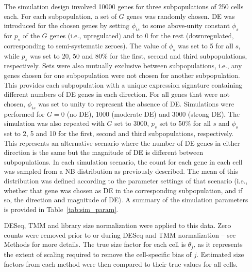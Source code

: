 \documentclass{bmcart}
\begin{document}
The simulation design involved 10000 genes for three subpopulations of 250 cells each.
For each subpopulation, a set of $G$ genes was randomly chosen.
DE was introduced for the chosen genes by setting $\phi_{is}$ to some above-unity constant $\phi_s$ for $p_s$ of the $G$ genes (i.e., upregulated) and to $0$ for the rest (downregulated, corresponding to semi-systematic zeroes).
The value of $\phi_s$ was set to 5 for all $s$, while $p_s$ was set to 20, 50 and 80\% for the first, second and third subpopulations, respectively.
Sets were also mutually exclusive between subpopulations, i.e., any genes chosen for one subpopulation were not chosen for another subpopulation.
This provides each subpopulation with a unique expression signature containing different numbers of DE genes in each direction.
For all genes that were not chosen, $\phi_{is}$ was set to unity to represent the absence of DE.
Simulations were performed for $G = 0$ (no DE), 1000 (moderate DE) and 3000 (strong DE).
The simulation was also repeated with $G$ set to 3000, $p_s$ set to 50\% for all $s$ and $\phi_{s}$ set to 2, 5 and 10 for the first, second and third subpopulations, respectively.
This represents an alternative scenario where the number of DE genes in either direction is the same but the magnitude of DE is different between subpopulations.
In each simulation scenario, the count for each gene in each cell was sampled from a NB distribution as previously described.
The mean of this distribution was defined according to the parameter settings of that scenario (i.e., whether that gene was chosen as DE in the corresponding subpopulation, and if so, the direction and magnitude of DE).
A summary of the simulation parameters is provided in Table~\ref{tab:sim_param}.    

DESeq, TMM and library size normalization were applied to this data.
Zero counts were removed prior to or during DESeq and TMM normalization -- see Methods for more details.
The true size factor for each cell is $\theta_j$, as it represents the extent of scaling required to remove the cell-specific bias of $j$.
Estimated size factors from each method were then compared to their true values for all cells.
\end{document}
